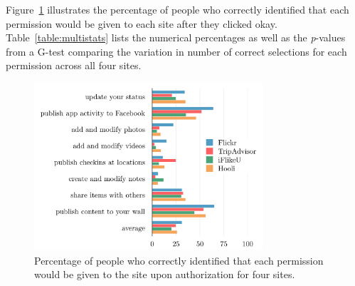 \documentclass[10pt]{sig-alternate-10pt}
\begin{document}
Figure~\ref{figure:multipercents} illustrates the percentage of people who correctly identified that each permission would be given to each site after they clicked okay. Table~\ref{table:multistats} lists the numerical percentages as well as the \emph{p}-values from a G-test comparing the variation in number of correct selections for each permission across all four sites.

\begin{figure}[h!]
  \centering
  \includegraphics[width=8.5cm]{multi_percents_cosn}
  \caption{Percentage of people who correctly identified that each permission would be given to the site upon authorization for four sites.}
  \label{figure:multipercents}
\end{figure}
\end{document}
